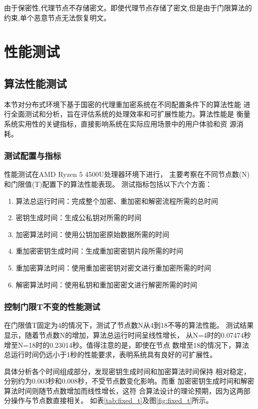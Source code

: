 由于保密性,代理节点不存储密文。即使代理节点存储了密文,但是由于门限算法的约束,单个恶意节点无法恢复明文。


\section{性能测试}

\subsection{算法性能测试}

本节对分布式环境下基于国密的代理重加密系统在不同配置条件下的算法性能
进行全面测试和分析，旨在评估系统的处理效率和可扩展性能力。算法性能是
衡量系统实用性的关键指标，直接影响系统在实际应用场景中的用户体验和资
源消耗。

\subsubsection{测试配置与指标}

性能测试在AMD Ryzen 5 4500U处理器环境下进行，
主要考察在不同节点数(N)和门限值(T)配置下的算法性能表现。
测试指标包括以下六个方面：

\begin{enumerate}
	\item 算法总运行时间：完成整个加密、重加密和解密流程所需的总时间
	\item 密钥生成时间：生成公私钥对所需的时间
	\item 加密算法时间：使用公钥加密原始数据所需的时间
	\item 重加密密钥生成时间：生成重加密密钥片段所需的时间
	\item 重加密算法时间：使用重加密密钥对密文进行重加密所需的时间
	\item 解密算法时间：使用私钥和重加密密文进行解密所需的时间
\end{enumerate}

\subsubsection{控制门限T不变的性能测试}

在门限值T固定为4的情况下，测试了节点数N从4到18不等的算法性能。
测试结果显示，随着节点数N的增加，算法总运行时间呈线性增长，
从N=4时的0.07474秒增至N=18时的0.23014秒。值得注意的是，即使在节点
数增至18的情况下，算法总运行时间仍远小于1秒的性能要求，表明系统具有良好的可扩展性。

具体分析各个时间组成部分，发现密钥生成时间和加密算法时间保持
相对稳定，分别约为0.003秒和0.008秒，不受节点数变化影响。而重
加密密钥生成时间和解密算法时间则随节点数增加而线性增长，这符
合算法设计的理论预期，因为这两部分操作与节点数直接相关。
如表\ref{tab:fixed_t}及图\ref{fig:fixed_t}所示。

